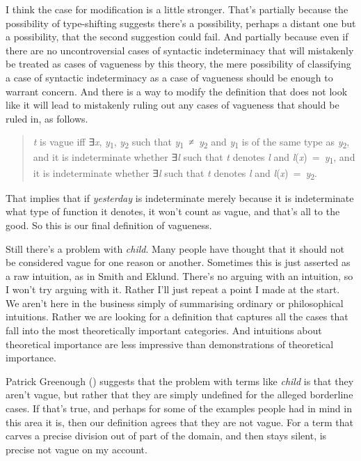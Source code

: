 \documentclass[
  11pt,
  letterpaper,
  DIV=11,
  numbers=noendperiod,
  twoside]{scrartcl}
\begin{document}
I think the case for modification is a little stronger. That's partially
because the possibility of type-shifting suggests there's a possibility,
perhaps a distant one but a possibility, that the second suggestion
could fail. And partially because even if there are no uncontroversial
cases of syntactic indeterminacy that will mistakenly be treated as
cases of vagueness by this theory, the mere possibility of classifying a
case of syntactic indeterminacy as a case of vagueness should be enough
to warrant concern. And there is a way to modify the definition that
does not look like it will lead to mistakenly ruling out any cases of
vagueness that should be ruled in, as follows.

\begin{quote}
\emph{t} is vague iff ∃\emph{x}, \emph{y}\textsubscript{1},
\emph{y}\textsubscript{2} such that
\emph{y}\textsubscript{1}~≠~\emph{y}\textsubscript{2} and
\emph{y}\textsubscript{1} is of the same type as
\emph{y}\textsubscript{2}, and it is indeterminate whether ∃\emph{l}
such that \emph{t} denotes \emph{l} and
\emph{l}(\emph{x})~=~\emph{y}\textsubscript{1}, and it is indeterminate
whether ∃\emph{l} such that \emph{t} denotes \emph{l} and
\emph{l}(\emph{x})~=~\emph{y}\textsubscript{2}.
\end{quote}

That implies that if \emph{yesterday} is indeterminate merely because it
is indeterminate what type of function it denotes, it won't count as
vague, and that's all to the good. So this is our final definition of
vagueness.

Still there's a problem with \emph{child}. Many people have thought that
it should not be considered vague for one reason or another. Sometimes
this is just asserted as a raw intuition, as in Smith and Eklund.
There's no arguing with an intuition, so I won't try arguing with it.
Rather I'll just repeat a point I made at the start. We aren't here in
the business simply of summarising ordinary or philosophical intuitions.
Rather we are looking for a definition that captures all the cases that
fall into the most theoretically important categories. And intuitions
about theoretical importance are less impressive than demonstrations of
theoretical importance.

Patrick Greenough () suggests that the
problem with terms like \emph{child} is that they aren't vague, but
rather that they are simply undefined for the alleged borderline cases.
If that's true, and perhaps for some of the examples people had in mind
in this area it is, then our definition agrees that they are not vague.
For a term that carves a precise division out of part of the domain, and
then stays silent, is precise not vague on my account.
\end{document}
